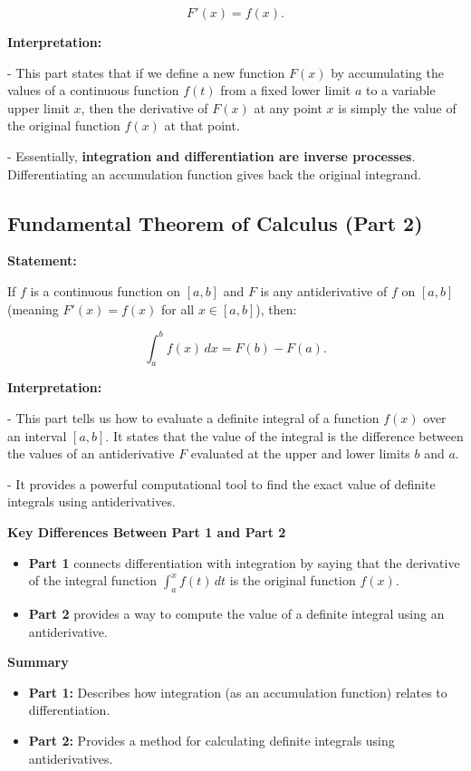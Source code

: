 \documentclass[a4paper,12pt]{book}
\begin{document}
\[
F'(x) = f(x).
\]

\textbf{Interpretation:}

- This part states that if we define a new function \( F(x) \) by accumulating the values of a continuous function \( f(t) \) from a fixed lower limit \( a \) to a variable upper limit \( x \), then the derivative of \( F(x) \) at any point \( x \) is simply the value of the original function \( f(x) \) at that point.

- Essentially, \textbf{integration and differentiation are inverse processes}. Differentiating an accumulation function gives back the original integrand.

\subsection{Fundamental Theorem of Calculus (Part 2)}

\textbf{Statement:}

If \( f \) is a continuous function on \([a, b]\) and \( F \) is any antiderivative of \( f \) on \([a, b]\) (meaning \( F'(x) = f(x) \) for all \( x \in [a, b]\)), then:

\[
\int_{a}^{b} f(x) \, dx = F(b) - F(a).
\]

\textbf{Interpretation:}

- This part tells us how to evaluate a definite integral of a function \( f(x) \) over an interval \([a, b]\). It states that the value of the integral is the difference between the values of an antiderivative \( F \) evaluated at the upper and lower limits \( b \) and \( a \).

- It provides a powerful computational tool to find the exact value of definite integrals using antiderivatives.

\textbf{Key Differences Between Part 1 and Part 2}

\begin{itemize}
\item
\textbf{Part 1} connects differentiation with integration by saying that the derivative of the integral function \( \int_{a}^{x} f(t) \, dt \) is the original function \( f(x) \).

\item
\textbf{Part 2} provides a way to compute the value of a definite integral using an antiderivative.
\end{itemize}

\textbf{Summary}

\begin{itemize}
\item
\textbf{Part 1:} Describes how integration (as an accumulation function) relates to differentiation.

\item
\textbf{Part 2:} Provides a method for calculating definite integrals using antiderivatives.
\end{itemize}
\end{document}
